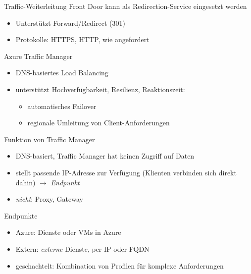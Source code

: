 \begin{flashcard}[Definition]{Traffic-Weiterleitung}
    Front Door kann als Redirection-Service eingesetzt werden
    \begin{itemize}
        \item Unterstützt Forward/Redirect (301)
        \item Protokolle: HTTPS, HTTP, wie angefordert
    \end{itemize}
\end{flashcard}


\begin{flashcard}[Definition]{Azure Traffic Manager}
    \begin{itemize}
        \item DNS-basiertes Load Balancing
        \item unterstützt Hochverfügbarkeit, Resilienz, Reaktionszeit:
            \begin{itemize}
                \item automatisches Failover
                \item regionale Umleitung von Client-Anforderungen
            \end{itemize}
    \end{itemize}
\end{flashcard}

\begin{flashcard}[Definition]{Funktion von Traffic Manager}
    \begin{itemize}
        \item DNS-basiert, Traffic Manager hat keinen Zugriff auf Daten
        \item stellt passende IP-Adresse zur Verfügung (Klienten verbinden sich direkt dahin)\newline
            $\rightarrow$ \emph{Endpunkt}
        \item \emph{nicht}: Proxy, Gateway
    \end{itemize}
    \vspace{1cm}
    Endpunkte
    \begin{itemize}
        \item Azure: Dienste oder VMs in Azure
        \item Extern: \emph{externe} Dienste, per IP oder FQDN
        \item geschachtelt: Kombination von Profilen für komplexe Anforderungen
    \end{itemize}
\end{flashcard}

